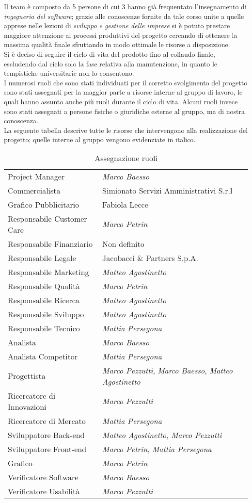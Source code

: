 Il team \`{e} composto da 5 persone di cui 3 hanno gi\`{a} frequentato l'insegnamento di \textit{ingegneria del 
software}; grazie alle conoscenze fornite da tale corso unite a quelle apprese nelle lezioni di \textit{sviluppo e gestione delle imprese} si è potuto prestare maggiore attenzione ai processi produttivi del progetto cercando di ottenere la massima qualità finale sfruttando in modo ottimale le risorse a disposizione.\\
Si \`{e} deciso di seguire il ciclo di vita del prodotto fino al collaudo finale, escludendo dal ciclo solo la fase relativa alla manutenzione, in quanto le tempistiche universitarie non lo consentono.\\
I numerosi ruoli che sono stati individuati per il corretto svolgimento del progetto sono stati assegnati per la maggior parte a risorse interne al gruppo di lavoro, le quali hanno assunto anche più ruoli durante il ciclo di vita. Alcuni ruoli invece sono stati assegnati a persone fisiche o giuridiche esterne al gruppo, ma di nostra conoscenza.\\
La seguente tabella descrive tutte le risorse che intervengono alla realizzazione del progetto; quelle interne al gruppo vengono evidenziate in italico.

\begin{table}[H]
\begin{longtable}{|>{\centering}p{5cm}| >{\centering}m{9cm}|}
    \hline
    \multicolumn{1}{|c|}{\textbf{Ruolo}} &
    \multicolumn{1}{c|}{\textbf{Risorse assegnate}} \\ %
      \hline
		Project Manager & \textit{Marco Baesso} \tabularnewline
		Commercialista & Simionato Servizi Amministrativi S.r.l \tabularnewline
		Grafico Pubblicitario & Fabiola Lecce \tabularnewline
		Responsabile Customer Care & \textit{Marco Petrin} \tabularnewline 
		Responsabile Finanziario & Non definito \tabularnewline
		Responsabile Legale & Jacobacci \& Partners S.p.A.  \tabularnewline
		Responsabile Marketing & \textit{Matteo Agostinetto}  \tabularnewline
		Responsabile Qualit\`{a} & \textit{Marco Petrin} \tabularnewline
		Responsabile Ricerca &  \textit{Matteo Agostinetto} \tabularnewline
		Responsabile Sviluppo & \textit{Matteo Agostinetto}  \tabularnewline
		Responsabile Tecnico & \textit{Mattia Persegona} \tabularnewline
		Analista & \textit{Marco Baesso} \tabularnewline
		Analista Competitor &  \textit{Mattia Persegona} \tabularnewline
		Progettista & \textit{Marco Pezzutti}, \textit{Marco Baesso}, \textit{Matteo Agostinetto} \tabularnewline
		Ricercatore di Innovazioni & \textit{Marco Pezzutti} \tabularnewline
		Ricercatore di Mercato & \textit{Mattia Persegona} \tabularnewline
		Sviluppatore Back-end & \textit{Matteo Agostinetto}, \textit{Marco Pezzutti} \tabularnewline
		Sviluppatore Front-end & \textit{Marco Petrin}, \textit{Mattia Persegona} \tabularnewline
		Grafico & \textit{Marco Petrin} \tabularnewline
		Verificatore Software & \textit{Marco Baesso} \tabularnewline
		Verificatore Usabilit\`{a} & \textit{Marco Pezzutti} \tabularnewline
        \hline
\end{longtable}
\caption{Assegnazione ruoli}
\label{tab: Tabella assegnazione ruoli}
\end{table}